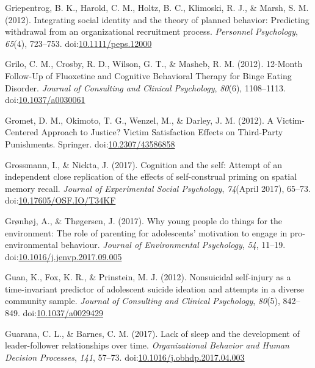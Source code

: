 \documentclass[english,man]{apa6}
\begin{document}
\hypertarget{ref-Griepentrog2012}{}
Griepentrog, B. K., Harold, C. M., Holtz, B. C., Klimoski, R. J., \&
Marsh, S. M. (2012). Integrating social identity and the theory of
planned behavior: Predicting withdrawal from an organizational
recruitment process. \emph{Personnel Psychology}, \emph{65}(4),
723--753.
doi:\href{https://doi.org/10.1111/peps.12000}{10.1111/peps.12000}

\hypertarget{ref-Grilo2012}{}
Grilo, C. M., Crosby, R. D., Wilson, G. T., \& Masheb, R. M. (2012).
12-Month Follow-Up of Fluoxetine and Cognitive Behavioral Therapy for
Binge Eating Disorder. \emph{Journal of Consulting and Clinical
Psychology}, \emph{80}(6), 1108--1113.
doi:\href{https://doi.org/10.1037/a0030061}{10.1037/a0030061}

\hypertarget{ref-Gromet2012}{}
Gromet, D. M., Okimoto, T. G., Wenzel, M., \& Darley, J. M. (2012). A
Victim-Centered Approach to Justice? Victim Satisfaction Effects on
Third-Party Punishments. Springer.
doi:\href{https://doi.org/10.2307/43586858}{10.2307/43586858}

\hypertarget{ref-Grossmann2017}{}
Grossmann, I., \& Nickta, J. (2017). Cognition and the self: Attempt of
an independent close replication of the effects of self-construal
priming on spatial memory recall. \emph{Journal of Experimental Social
Psychology}, \emph{74}(April 2017), 65--73.
doi:\href{https://doi.org/10.17605/OSF.IO/T34KF}{10.17605/OSF.IO/T34KF}

\hypertarget{ref-Gruxf8nhuxf8j2017}{}
Grønhøj, A., \& Thøgersen, J. (2017). Why young people do things for the
environment: The role of parenting for adolescents' motivation to engage
in pro-environmental behaviour. \emph{Journal of Environmental
Psychology}, \emph{54}, 11--19.
doi:\href{https://doi.org/10.1016/j.jenvp.2017.09.005}{10.1016/j.jenvp.2017.09.005}

\hypertarget{ref-Guan2012}{}
Guan, K., Fox, K. R., \& Prinstein, M. J. (2012). Nonsuicidal
self-injury as a time-invariant predictor of adolescent suicide ideation
and attempts in a diverse community sample. \emph{Journal of Consulting
and Clinical Psychology}, \emph{80}(5), 842--849.
doi:\href{https://doi.org/10.1037/a0029429}{10.1037/a0029429}

\hypertarget{ref-Guarana2017}{}
Guarana, C. L., \& Barnes, C. M. (2017). Lack of sleep and the
development of leader-follower relationships over time.
\emph{Organizational Behavior and Human Decision Processes}, \emph{141},
57--73.
doi:\href{https://doi.org/10.1016/j.obhdp.2017.04.003}{10.1016/j.obhdp.2017.04.003}
\end{document}
